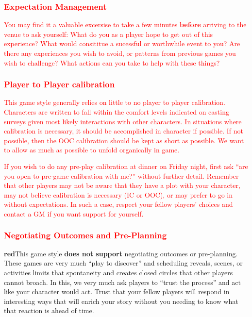 \documentclass[sheet]{GL2020}
\begin{document}
\textcolor{red}{\subsubsection{Expectation Management}}
\textcolor{red}{You may find it a valuable excersise to take a few minutes \textbf{before} arriving to the venue to ask yourself: What do you as a player hope to get out of this experience? What would consititue a sucessful or worthwhile event to you? Are there any experiences you wish to avoid, or patterns from previous games you wish to challenge? What actions can you take to help with these things?}

\textcolor{red}{\subsubsection{Player to Player calibration}}
\textcolor{red}{This game style generally relies on little to no player to player calibration. Characters are written to fall within the comfort levels indicated on casting surveys given most likely interactions with other characters. In situations where calibration is necessary, it should be accomplished in character if possible. If not possible, then the OOC calibration should be kept as short as possible. We want to allow as much as possible to unfold organically in game.}

\textcolor{red}{If you wish to do any pre-play calibration at dinner on Friday night, first ask ``are you open to pre-game calibration with me?'' without further detail.  Remember that other players may not be aware that they have a plot with your character, may not believe calibration is necessary (IC or OOC), or may prefer to go in without expectations. In such a case, respect your fellow players' choices and contact a GM if you want support for yourself.}

\textcolor{red}{\subsubsection{Negotiating Outcomes and Pre-Planning}}
\textbf{red}{This game style \textbf{does not support} negotiating outcomes or pre-planning. These games are very much ``play to discover'' and scheduling reveals, scenes, or activities limits that spontaneity and creates closed circles that other players cannot broach. In this, we very much ask players to ``trust the process'' and act like your character would act. Trust that your fellow players will respond in interesting ways that will enrich your story without you needing to know what that reaction is ahead of time.}
\end{document}
